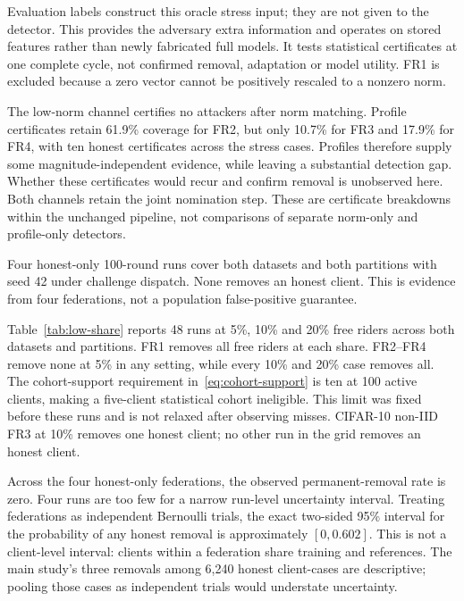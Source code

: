 \documentclass[journal]{IEEEtran}
\makeatletter
\renewcommand{\subsection}{\@startsection{subsection}{2}{\z@}{1.5ex}{0.7ex}{\normalfont\normalsize\itshape}}
\makeatother
\begin{document}
Evaluation labels construct this oracle stress input; they are not given
to the detector. This provides the adversary extra information and
operates on stored features rather than newly fabricated full models.
It tests statistical certificates at one complete cycle, not confirmed
removal, adaptation or model utility. FR1 is excluded because a zero
vector cannot be positively rescaled to a nonzero norm.

The low-norm channel certifies no attackers after norm matching.
Profile certificates retain 61.9\% coverage for FR2, but only 10.7\%
for FR3 and 17.9\% for FR4, with ten honest certificates across the
stress cases. Profiles therefore supply some magnitude-independent
evidence, while leaving a substantial detection gap. Whether these
certificates would recur and confirm removal is unobserved here.
Both channels retain the joint nomination step. These are certificate
breakdowns within the unchanged pipeline, not comparisons of separate
norm-only and profile-only detectors.

\subsection{Honest-Only and Lower-Prevalence Checks}
Four honest-only 100-round runs cover both datasets and both partitions
with seed 42 under challenge dispatch. None removes an honest client.
This is evidence from four federations, not a population false-positive
guarantee.

Table~\ref{tab:low-share} reports 48 runs at 5\%, 10\% and 20\% free
riders across both datasets and partitions. FR1 removes all free riders
at each share. FR2--FR4 remove none at 5\% in any setting, while every
10\% and 20\% case removes all. The cohort-support requirement
in~\eqref{eq:cohort-support} is ten at 100 active clients, making a
five-client statistical cohort ineligible. This limit was fixed before
these runs and is not relaxed after observing misses. CIFAR-10 non-IID
FR3 at 10\% removes one honest client; no other run in the grid removes
an honest client.


Across the four honest-only federations, the observed permanent-removal
rate is zero. Four runs are too few for a narrow run-level uncertainty
interval. Treating federations as independent Bernoulli trials, the exact
two-sided 95\% interval for the probability of any honest removal is
approximately $[0,0.602]$. This is not a client-level interval: clients
within a federation share training and references. The main study's
three removals among 6,240 honest client-cases are descriptive; pooling
those cases as independent trials would understate uncertainty.
\end{document}
